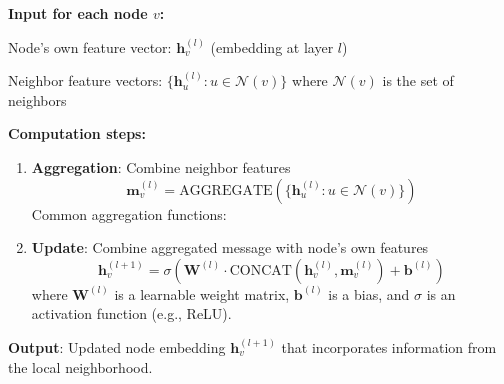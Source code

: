 \begin{infobox}
    \textbf{Input for each node $v$:}
\begin{compactitemize}
    \item Node's own feature vector: $\mathbf{h}_v^{(l)}$ (embedding at layer $l$)
    \item Neighbor feature vectors: $\{\mathbf{h}_u^{(l)} : u \in \mathcal{N}(v)\}$ where $\mathcal{N}(v)$ is the set of neighbors
\end{compactitemize}

\textbf{Computation steps:}
\begin{enumerate}
    \item \textbf{Aggregation}: Combine neighbor features
    $$\mathbf{m}_v^{(l)} = \text{AGGREGATE}\left(\{\mathbf{h}_u^{(l)} : u \in \mathcal{N}(v)\}\right)$$
    Common aggregation functions:
    
    \item \textbf{Update}: Combine aggregated message with node's own features
    $$\mathbf{h}_v^{(l+1)} = \sigma\left(\mathbf{W}^{(l)} \cdot \text{CONCAT}(\mathbf{h}_v^{(l)}, \mathbf{m}_v^{(l)}) + \mathbf{b}^{(l)}\right)$$
    where $\mathbf{W}^{(l)}$ is a learnable weight matrix, $\mathbf{b}^{(l)}$ is a bias, and $\sigma$ is an activation function (e.g., ReLU).
\end{enumerate}

\textbf{Output}: Updated node embedding $\mathbf{h}_v^{(l+1)}$ that incorporates information from the local neighborhood.
\end{infobox}

